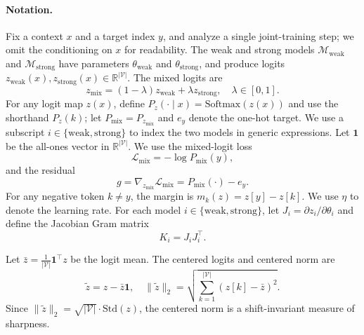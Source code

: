 \paragraph{Notation.}
Fix a context $x$ and a target index $y$, and analyze a single joint-training step; we omit the conditioning on $x$ for readability. The weak and strong models $\mathcal{M}_{\mathrm{weak}}$ and $\mathcal{M}_{\mathrm{strong}}$ have parameters $\theta_{\mathrm{weak}}$ and $\theta_{\mathrm{strong}}$, and produce logits $z_{\mathrm{weak}}(x), z_{\mathrm{strong}}(x) \in \mathbb{R}^{|\mathcal{V}|}$. The mixed logits are
\begin{equation}
    z_{\text{mix}} = (1-\lambda) z_{\mathrm{weak}} + \lambda z_{\mathrm{strong}}, \quad \lambda \in [0,1].
    \label{eq:appendix_mix}
\end{equation}
For any logit map $z(x)$, define $P_z(\cdot\mid x)=\mathrm{Softmax}(z(x))$ and use the shorthand $P_z(k)$; let $P_{\mathrm{mix}} = P_{z_{\text{mix}}}$ and $e_y$ denote the one-hot target. We use a subscript $i \in \{\mathrm{weak}, \mathrm{strong}\}$ to index the two models in generic expressions. Let $\mathbf{1}$ be the all-ones vector in $\mathbb{R}^{|\mathcal{V}|}$.
We use the mixed-logit loss
\begin{equation}
    \mathcal{L}_{\mathrm{mix}} = -\log P_{\mathrm{mix}}(y),
    \label{eq:appendix_ce}
\end{equation}
and the residual
\begin{equation}
    g = \nabla_{z_{\text{mix}}}\mathcal{L}_{\mathrm{mix}} = P_{\mathrm{mix}}(\cdot) - e_y.
    \label{eq:appendix_residual}
\end{equation}
For any negative token $k \neq y$, the margin is $m_k(z) = z[y] - z[k]$.
We use $\eta$ to denote the learning rate.
For each model $i \in \{\mathrm{weak}, \mathrm{strong}\}$, let $J_i = \partial z_i / \partial \theta_i$ and define the Jacobian Gram matrix
\begin{equation}
    K_i = J_i J_i^\top.
    \label{eq:appendix_gram}
\end{equation}

\begin{definition}
Let $\bar{z} = \frac{1}{|\mathcal{V}|}\mathbf{1}^\top z$ be the logit mean. The centered logits and centered norm are
\begin{equation}
    \tilde{z} = z - \bar{z}\mathbf{1}, \quad \|\tilde{z}\|_2 = \sqrt{\sum_{k=1}^{|\mathcal{V}|} (z[k] - \bar{z})^2}.
    \label{eq:appendix_centered_norm}
\end{equation}
Since $\|\tilde{z}\|_2 = \sqrt{|\mathcal{V}|} \cdot \text{Std}(z)$, the centered norm is a shift-invariant measure of sharpness.
\end{definition}

